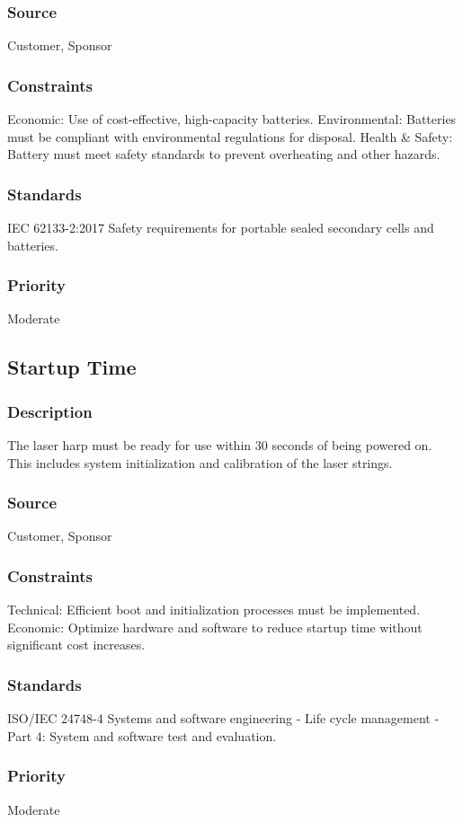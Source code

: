 \subsubsection{Source}
Customer, Sponsor
\subsubsection{Constraints}
Economic: Use of cost-effective, high-capacity batteries.
Environmental: Batteries must be compliant with environmental regulations for disposal.
Health & Safety: Battery must meet safety standards to prevent overheating and other hazards.
\subsubsection{Standards}
IEC 62133-2:2017 Safety requirements for portable sealed secondary cells and batteries.
\subsubsection{Priority}
Moderate


\subsection{Startup Time}
\subsubsection{Description}
The laser harp must be ready for use within 30 seconds of being powered on. This includes system initialization and calibration of the laser strings.
\subsubsection{Source}
Customer, Sponsor
\subsubsection{Constraints}
Technical: Efficient boot and initialization processes must be implemented.
Economic: Optimize hardware and software to reduce startup time without significant cost increases.
\subsubsection{Standards}
ISO/IEC 24748-4 Systems and software engineering - Life cycle management - Part 4: System and software test and evaluation.
\subsubsection{Priority}
Moderate


